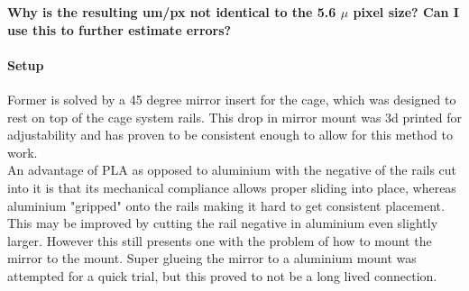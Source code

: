 \documentclass[twoside,openright]{scrreprt}
\begin{document}
\textbf{Why is the resulting um/px not identical to the 5.6 $\mu$ pixel size? Can I use this to further estimate errors?}
\paragraph{Setup}
Former is solved by a 45 degree mirror insert for the cage, which was designed to rest on top of the cage system rails. This drop in mirror mount was 3d printed for adjustability and has proven to be consistent enough to allow for this method to work. \\
An advantage of PLA as opposed to aluminium with the negative of the rails cut into it is that its mechanical compliance allows proper sliding into place, whereas aluminium "gripped" onto the rails making it hard to get consistent placement. This may be improved by cutting the rail negative in aluminium even slightly larger. However this still presents one with the problem of how to mount the mirror to the mount. Super glueing  the mirror to a aluminium mount was attempted for a quick trial, but this proved to not be a long lived connection.\\
\end{document}
